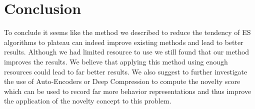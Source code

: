 \documentclass[11 pt, twocolumn]{article}
\begin{document}
\section{Conclusion}
To conclude it seems like the method we described to reduce the tendency of ES algorithms to plateau can indeed improve existing methods and lead to better results. Although we had limited resource to use we still found that our method improves the results. We believe that applying this method using enough resources could lead to far better results. We also suggest to further investigate the use of Auto-Encoders or Deep Compression to compute the novelty score which can be used to record far more behavior representations and thus improve the application of the novelty concept to this problem.

 

\end{document}
